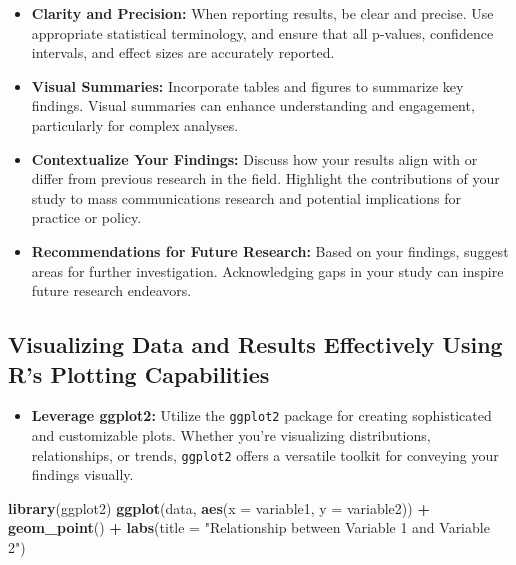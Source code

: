 \documentclass[
]{book}
\newenvironment{Shaded}{\begin{snugshade}}{\end{snugshade}}
\newcommand{\AttributeTok}[1]{\textcolor[rgb]{0.13,0.29,0.53}{#1}}
\newcommand{\FunctionTok}[1]{\textcolor[rgb]{0.13,0.29,0.53}{\textbf{#1}}}
\newcommand{\NormalTok}[1]{#1}
\newcommand{\SpecialCharTok}[1]{\textcolor[rgb]{0.81,0.36,0.00}{\textbf{#1}}}
\newcommand{\StringTok}[1]{\textcolor[rgb]{0.31,0.60,0.02}{#1}}
\providecommand{\tightlist}{%
  \setlength{\itemsep}{0pt}\setlength{\parskip}{0pt}}
\begin{document}
\begin{itemize}
\item
  \textbf{Clarity and Precision:} When reporting results, be clear and precise. Use appropriate statistical terminology, and ensure that all p-values, confidence intervals, and effect sizes are accurately reported.
\item
  \textbf{Visual Summaries:} Incorporate tables and figures to summarize key findings. Visual summaries can enhance understanding and engagement, particularly for complex analyses.
\item
  \textbf{Contextualize Your Findings:} Discuss how your results align with or differ from previous research in the field. Highlight the contributions of your study to mass communications research and potential implications for practice or policy.
\item
  \textbf{Recommendations for Future Research:} Based on your findings, suggest areas for further investigation. Acknowledging gaps in your study can inspire future research endeavors.
\end{itemize}

\hypertarget{visualizing-data-and-results-effectively-using-rs-plotting-capabilities}{%
\subsection*{Visualizing Data and Results Effectively Using R's Plotting Capabilities}\label{visualizing-data-and-results-effectively-using-rs-plotting-capabilities}}

\begin{itemize}
\tightlist
\item
  \textbf{Leverage ggplot2:} Utilize the \texttt{ggplot2} package for creating sophisticated and customizable plots. Whether you're visualizing distributions, relationships, or trends, \texttt{ggplot2} offers a versatile toolkit for conveying your findings visually.
\end{itemize}

\begin{Shaded}
\begin{Highlighting}[]
\FunctionTok{library}\NormalTok{(ggplot2)}
\FunctionTok{ggplot}\NormalTok{(data, }\FunctionTok{aes}\NormalTok{(}\AttributeTok{x =}\NormalTok{ variable1, }\AttributeTok{y =}\NormalTok{ variable2)) }\SpecialCharTok{+} 
  \FunctionTok{geom\_point}\NormalTok{() }\SpecialCharTok{+} 
  \FunctionTok{labs}\NormalTok{(}\AttributeTok{title =} \StringTok{"Relationship between Variable 1 and Variable 2"}\NormalTok{)}
\end{Highlighting}
\end{Shaded}
\end{document}
